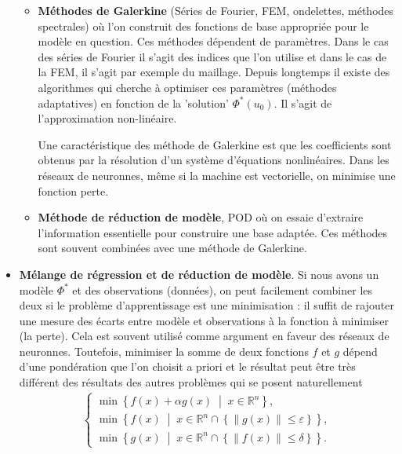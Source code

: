 \documentclass[11pt,a4paper, french]{article}
\newcommand{\R}{\mathbb R}
\newcommand{\eps}{\varepsilon}
\newcommand{\norm}[1]{\|#1\|}
\newcommand{\Set}[1]{\left\{#1\right\}}
\newcommand{\SetDef}[2]{\left\{#1\;\middle|\;#2\right\}}
\begin{document}
\begin{itemize}
\begin{itemize}
%
\item \textbf{Méthodes de Galerkine} (Séries de Fourier, FEM, ondelettes, méthodes spectrales) où l'on construit des fonctions de base appropriée pour le modèle en question. Ces méthodes dépendent de paramètres. Dans le cas des séries de Fourier il s'agit des indices que l'on utilise et dans le cas de la FEM, il s'agit par exemple du maillage. Depuis longtemps il existe des algorithmes qui cherche à optimiser ces paramètres (méthodes adaptatives) en fonction de la 'solution' $\Phi^*(u_0)$. Il s'agit de l'approximation non-linéaire. 

Une caractéristique des méthode de Galerkine est que les coefficients sont obtenus par la résolution d'un système d'équations nonlinéaires.
Dans les réseaux de neuronnes, même si la machine est vectorielle, on minimise une fonction perte.  
%
\item \textbf{Méthode de réduction de modèle}, POD où on essaie d'extraire l'information essentielle pour construire une base adaptée. Ces méthodes sont souvent combinées avec une méthode de Galerkine.
\end{itemize}
%
\item \textbf{Mélange de régression et de réduction de modèle}. Si nous avons un modèle $\Phi^*$ et des observations (données), on peut facilement combiner les deux si le problème d'apprentissage est une minimisation : il suffit de rajouter une mesure des écarts entre modèle et observations à la fonction à minimiser (la perte). Cela est souvent utilisé comme argument en faveur des réseaux de neuronnes. 
Toutefois, minimiser la somme de deux fonctions $f$ et $g$ dépend d'une pondération que l'on choisit a priori et le résultat peut être très différent des résultats des autres problèmes qui se posent naturellement
\begin{align*}
\left\{
\begin{aligned}
\min\SetDef{f(x)+\alpha g(x)}{x\in\R^n},\\ 
\min\SetDef{f(x)}{x\in\R^n\cap\Set{\norm{g(x)}\le \eps}},\\
\min\SetDef{g(x)}{x\in\R^n\cap\Set{\norm{f(x)}\le \delta}}.
\end{aligned}
\right.
\end{align*}
\end{itemize}
%
\end{document}
